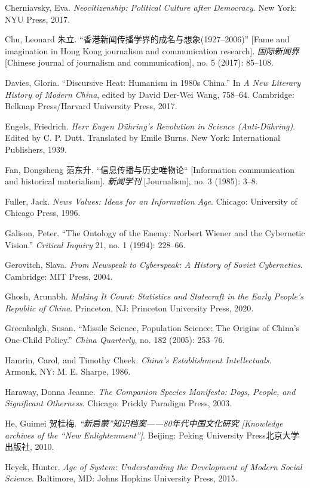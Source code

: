 \documentclass{tufte-handout}
\begin{document}
\begin{CJK*}{UTF8}{gbsn}
\begin{hangparas}{.25in}{1}
\begin{CJK*}{UTF8}{gbsn}
Cherniavsky, Eva. \emph{Neocitizenship: Political Culture after
Democracy}. New York: NYU Press, 2017.

Chu, Leonard 朱立. ``香港新闻传播学界的成名与想象(1927--2006)'' {[}Fame
and imagination in Hong Kong journalism and communication research{]}.
\emph{国际新闻界} {[}Chinese journal of journalism and communication{]},
no. 5 (2017): 85--108.

Davies, Gloria. ``Discursive Heat: Humanism in 1980s China.'' In \emph{A
New Literary History of Modern China}, edited by David Der-Wei Wang,
758--64. Cambridge: Belknap Press/Harvard University Press, 2017.

Engels, Friedrich. \emph{Herr Eugen Dühring's Revolution in Science
(Anti-Dühring)}. Edited by C. P. Dutt. Translated by Emile Burns. New
York: International Publishers, 1939.

Fan, Dongsheng 范东升. ``信息传播与历史唯物论`` {[}Information
communication and historical materialism{]}. \emph{新闻学刊}
{[}Journalism{]}, no. 3 (1985): 3--8.

Fuller, Jack. \emph{News Values: Ideas for an Information Age}. Chicago:
University of Chicago Press, 1996.

Galison, Peter. ``The Ontology of the Enemy: Norbert Wiener and the
Cybernetic Vision.'' \emph{Critical Inquiry} 21, no. 1 (1994): 228--66.

Gerovitch, Slava. \emph{From Newspeak to Cyberspeak: A History of Soviet
Cybernetics}. Cambridge: MIT Press, 2004.

Ghosh, Arunabh. \emph{Making It Count: Statistics and Statecraft in the
Early People's Republic of China}. Princeton, NJ: Princeton University
Press, 2020.

Greenhalgh, Susan. ``Missile Science, Population Science: The Origins of
China's One-Child Policy.'' \emph{China Quarterly}, no. 182 (2005):
253--76.

Hamrin, Carol, and Timothy Cheek. \emph{China's Establishment
Intellectuals}. Armonk, NY: M. E. Sharpe, 1986.

Haraway, Donna Jeanne. \emph{The Companion Species Manifesto: Dogs,
People, and Significant Otherness}. Chicago: Prickly Paradigm Press,
2003.

He, Guimei 贺桂梅. \emph{``新启蒙''知识档案------80年代中国文化研究
{[}Knowledge archives of the ``New Enlightenment''{]}}. Beijing: Peking
University Press北京大学出版社, 2010.

Heyck, Hunter. \emph{Age of System: Understanding the Development of
Modern Social Science}. Baltimore, MD: Johns Hopkins University Press,
2015.


\end{CJK*}
\end{hangparas}
\end{CJK*}
\end{document}
